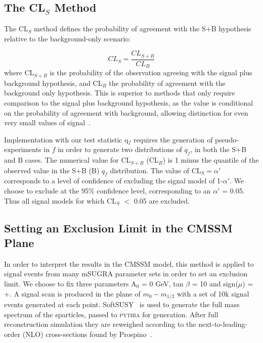 \subsection{The CL$_{S}$ Method}

The CL$_{S}$ method defines the probability of agreement with the S+B hypothesis relative to the background-only scenario:

\begin{equation}
CL_{S} = \frac{CL_{S+B}}{CL_{B}}
\label{eq:cls}
\end{equation} 
 where CL$_{S+B}$ is the probability of the observation agreeing with the signal plus background hypothesis, and CL$_{B}$ the probability of agreement with the background only hypothesis. This is superior to methods that only require comparison to the signal plus background hypothesis, as the value is conditional on the probability of agreement with background, allowing distinction for even very small values of signal~\cite{zech}.
 
 Implementation with our test statistic q$_{f}$ requires the generation of pseudo-experiments in $f$ in order to generate two distributions of $q_{f}$, in both the S+B and B cases. The numerical value for CL$_{S+B}$ (CL$_{B}$) is 1 minus the quantile of the observed value in the S+B (B) $q_{f}$ distribution. The value of CL$_{S} = \alpha'$ corresponds to a level of confidence of excluding the signal model of 1-$\alpha'$. We choose to exclude at the 95\% confidence level, corresponding to an $\alpha'$ = 0.05. Thus all signal models for which CL$_{S}$ $<$ 0.05 are excluded. 
 
\subsection{Setting an Exclusion Limit in the CMSSM Plane}
 
In order to interpret the results in the CMSSM model, this method is applied to signal events from many mSUGRA parameter sets in order to set an exclusion limit. We choose to fix three parameters A$_{0}$ = 0 GeV, tan $\beta$ = 10 and sign($\mu$) = +. A signal scan is produced in the plane of $m_{0} - m_{1/2}$ with a set of 10k signal events generated at each point. SoftSUSY~\cite{softsusy} is used to generate the full mass spectrum of the sparticles, passed to \textsc{pythia} for generation. After full reconstruction simulation they are reweighed according to the next-to-leading-order (NLO) cross-sections found by Prospino~\cite{prospino}. 

